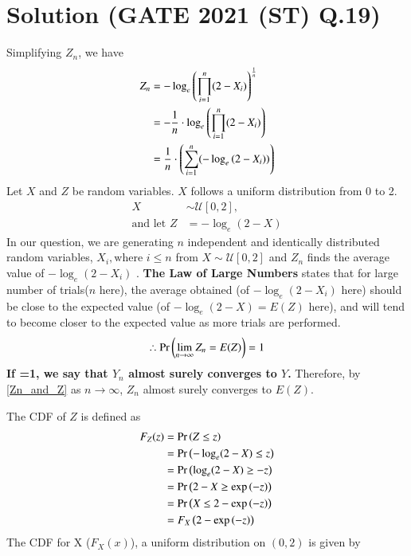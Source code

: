 \documentclass[journal,12pt,twocolumn]{IEEEtran}
\begin{document}
\section{Solution (GATE 2021 (ST) Q.19)}
Simplifying $Z_n$, we have
\begin{align}
    Z_n &= -\log_e \left( \prod\limits_{i=1}^n (2-X_i) \right)^\frac{1}{n}\\
        &= -\frac{1}{n}\cdot \log_e \left( \prod\limits_{i=1}^n (2-X_i) \right)\\
        &= \frac{1}{n}\cdot\left( \sum\limits_{i=1}^n (-\log_e \left( 2-X_i )\right) \right)
\end{align}
Let $X$ and $Z$ be random variables. $X$ follows a uniform distribution from 0 to 2.
\begin{align}
    X &\sim \mathcal{U}[0,2],\\
    \text{and let }    Z&=-\log_e (2-X)
\end{align}
In our question, we are generating $n$ independent and identically distributed random variables, $X_i , \text{where } i \leq n$ from $X \sim \mathcal{U}[0,2]$ and $Z_n$ finds the average value of $-\log_e (2-X_i)$ . \textbf{The Law of Large Numbers} states that for large number of trials($n$ here), the average obtained (of $-\log_e (2-X_i)$ here) should be close to the expected value (of $-\log_e (2-X)=E(Z)$ here), and will tend to become closer to the expected value as more trials are performed. 
\begin{align}
    \therefore \pr{\lim\limits_{n \to \infty}Z_n=E(Z)}=1
    \label{Zn_and_Z}
\end{align}
\textbf{If =1, we say that $Y_n$ almost surely converges to $Y$.} Therefore, by \eqref{Zn_and_Z} as $n \to \infty$, $Z_n$ almost surely converges to $E(Z)$.\\
\par The CDF of $Z$ is defined as 
\begin{align}
    F_Z(z) &= \pr{Z \leq z} \\
           &= \pr{ -\log_e(2-X)\leq z} \\
           &= \pr{\log_e(2-X) \geq -z}\\
           &= \pr{2-X \geq \exp\brak{-z}}\\
           &= \pr{X \leq 2- \exp\brak{-z}}\\
           &= F_X\brak{2- \exp\brak{-z}}
\label{CDF_Z}
\end{align}
The CDF for X ($F_X(x)$), a uniform distribution on $(0,2)$ is given by
\end{document}
